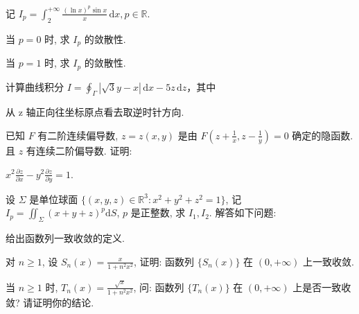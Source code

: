 \par{}
记 $I_{p} = \int_{2}^{+\infty} \frac{(\ln x)^{p} \sin x}{x} \, \mathrm{d}x, p \in \mathbb{R}$.\par
当 $p = 0$ 时, 求 $I_{p}$ 的敛散性.\par
当 $p = 1$ 时, 求 $I_{p}$ 的敛散性.\par
\par{}
\par{}
计算曲线积分 $I = \oint_{\Gamma} |\sqrt{3}y - x| \, \mathrm{d}x - 5z \, \mathrm{d}z$，其中\par
\nopagebreak[4]
从 z 轴正向往坐标原点看去取逆时针方向.\par
\par{}
\par{}
已知 $F$ 有二阶连续偏导数, $z = z(x, y)$ 是由 $F\left(z + \frac{1}{x}, z - \frac{1}{y}\right) = 0$ 确定的隐函数. 且 $z$ 有连续二阶偏导数. 证明:  

$x^{2} \frac{\partial z}{\partial x} - y^{2} \frac{\partial z}{\partial y} = 1$.\par
\nopagebreak[4]
\par{}
设 $\Sigma$ 是单位球面 $\{(x, y, z) \in \mathbb{R}^3 : x^2 + y^2 + z^2 = 1\}$, 记 $I_p = \iint_{\Sigma} (x + y + z)^p \mathrm{d}S$, $p$ 是正整数, 求 $I_1, I_2$.
解答如下问题:\par
给出函数列一致收敛的定义.\par
对 $n \geq 1$, 设 $S_{n}(x) = \frac{x}{1 + n^{2}x^{2}}$, 证明: 函数列 $\{S_{n}(x)\}$ 在 $(0, +\infty)$ 上一致收敛.\par
当 $n \geq 1$ 时, $T_{n}(x) = \frac{\sqrt{x}}{1 + n^{2}x^{2}}$, 问: 函数列 $\{T_{n}(x)\}$ 在 $(0, +\infty)$ 上是否一致收敛? 请证明你的结论.\par
